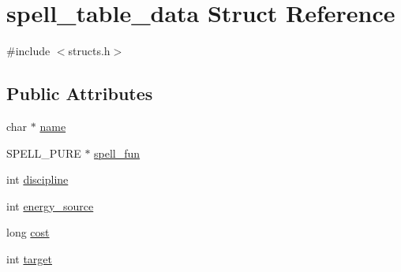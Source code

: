 \hypertarget{structspell__table__data}{\section{spell\-\_\-table\-\_\-data Struct Reference}
\label{structspell__table__data}
}


{\ttfamily \#include $<$structs.\-h$>$}

\subsection*{Public Attributes}
\begin{DoxyCompactItemize}
\item 
char $\ast$ \hyperlink{structspell__table__data_a3be3f1a8d33ce0d4c8caf2806ce551c9}{name}
\item 
S\-P\-E\-L\-L\-\_\-\-P\-U\-R\-E $\ast$ \hyperlink{structspell__table__data_a4fd5de4bed0016a1937dd3ed735c1c7d}{spell\-\_\-fun}
\item 
int \hyperlink{structspell__table__data_ab86f41a700bbfff8aef37a2e29abc0dc}{discipline}
\item 
int \hyperlink{structspell__table__data_a8093c61a451186d47de84ededb7b85d8}{energy\-\_\-source}
\item 
long \hyperlink{structspell__table__data_a8593b50ec2569a90656121a6730e3e7d}{cost}
\item 
int \hyperlink{structspell__table__data_a326a97e0820ab796ed917054bff836d9}{target}
\end{DoxyCompactItemize}


